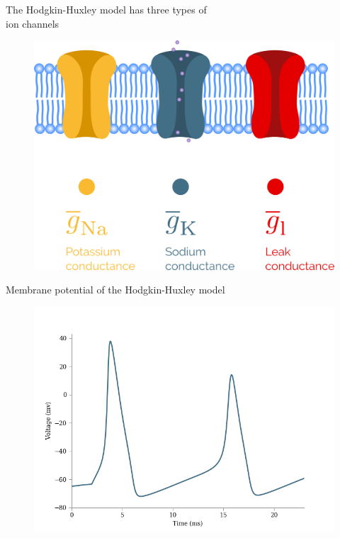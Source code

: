 \documentclass[presentation]{beamer}
\begin{document}

\begin{frame}{The Hodgkin-Huxley model has three types of \\ion channels}

  \begin{figure}
    \includegraphics[width=\textwidth]{deterministic_channels.png}
  \end{figure}
\end{frame}



\begin{frame}{Membrane potential of the Hodgkin-Huxley model}
  \vspace{-5mm}
  \begin{figure}
    \includegraphics[width=\textwidth]{hh_single.png}
  \end{figure}

\end{frame}
\end{document}
